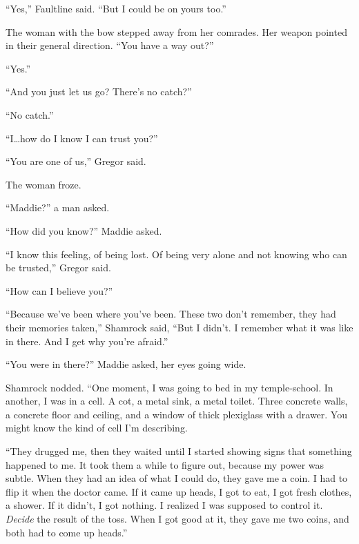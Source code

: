 ``Yes,'' Faultline said.  ``But I could be on yours too.''



The woman with the bow stepped away from her comrades.  Her weapon pointed in their general direction.  ``You have a way out?''



``Yes.''



``And you just let us go?  There's no catch?''



``No catch.''



``I\ldots how do I know I can trust you?''



``You are one of us,'' Gregor said.



The woman froze.



``Maddie?'' a man asked.



``How did you know?'' Maddie asked.



``I know this feeling, of being lost.  Of being very alone and not knowing who can be trusted,'' Gregor said.



``How can I believe you?''



``Because we've been where you've been.  These two don't remember, they had their memories taken,'' Shamrock said, ``But I didn't.  I remember what it was like in there.  And I get why you're afraid.''



``You were in there?''  Maddie asked, her eyes going wide.



Shamrock nodded.  ``One moment, I was going to bed in my temple-school.  In another, I was in a cell.  A cot, a metal sink, a metal toilet.  Three concrete walls, a concrete floor and ceiling, and a window of thick plexiglass with a drawer.  You might know the kind of cell I'm describing.



``They drugged me, then they waited until I started showing signs that something happened to me.  It took them a while to figure out, because my power was subtle.  When they had an idea of what I could do, they gave me a coin.  I had to flip it when the doctor came.  If it came up heads, I got to eat, I got fresh clothes, a shower.  If it didn't, I got nothing.  I realized I was supposed to control it.  \emph{Decide} the result of the toss.  When I got good at it, they gave me two coins, and both had to come up heads.''



